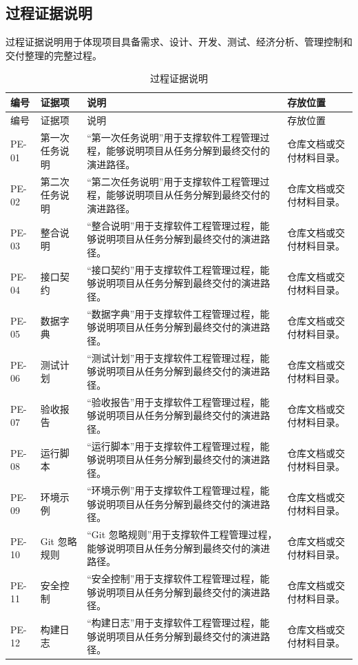 \documentclass[12pt,a4paper]{ctexart}
\begin{document}
\subsection{过程证据说明}
过程证据说明用于体现项目具备需求、设计、开发、测试、经济分析、管理控制和交付整理的完整过程。
\begin{longtable}{L{1.7cm}L{4.0cm}L{6.2cm}L{3.6cm}}
\caption{过程证据说明}\\
\toprule
编号 & 证据项 & 说明 & 存放位置 \\
\midrule
\endfirsthead
\toprule
编号 & 证据项 & 说明 & 存放位置 \\
\midrule
\endhead
PE-01 & 第一次任务说明 & “第一次任务说明”用于支撑软件工程管理过程，能够说明项目从任务分解到最终交付的演进路径。 & 仓库文档或交付材料目录。 \\
PE-02 & 第二次任务说明 & “第二次任务说明”用于支撑软件工程管理过程，能够说明项目从任务分解到最终交付的演进路径。 & 仓库文档或交付材料目录。 \\
PE-03 & 整合说明 & “整合说明”用于支撑软件工程管理过程，能够说明项目从任务分解到最终交付的演进路径。 & 仓库文档或交付材料目录。 \\
PE-04 & 接口契约 & “接口契约”用于支撑软件工程管理过程，能够说明项目从任务分解到最终交付的演进路径。 & 仓库文档或交付材料目录。 \\
PE-05 & 数据字典 & “数据字典”用于支撑软件工程管理过程，能够说明项目从任务分解到最终交付的演进路径。 & 仓库文档或交付材料目录。 \\
PE-06 & 测试计划 & “测试计划”用于支撑软件工程管理过程，能够说明项目从任务分解到最终交付的演进路径。 & 仓库文档或交付材料目录。 \\
PE-07 & 验收报告 & “验收报告”用于支撑软件工程管理过程，能够说明项目从任务分解到最终交付的演进路径。 & 仓库文档或交付材料目录。 \\
PE-08 & 运行脚本 & “运行脚本”用于支撑软件工程管理过程，能够说明项目从任务分解到最终交付的演进路径。 & 仓库文档或交付材料目录。 \\
PE-09 & 环境示例 & “环境示例”用于支撑软件工程管理过程，能够说明项目从任务分解到最终交付的演进路径。 & 仓库文档或交付材料目录。 \\
PE-10 & Git 忽略规则 & “Git 忽略规则”用于支撑软件工程管理过程，能够说明项目从任务分解到最终交付的演进路径。 & 仓库文档或交付材料目录。 \\
PE-11 & 安全控制 & “安全控制”用于支撑软件工程管理过程，能够说明项目从任务分解到最终交付的演进路径。 & 仓库文档或交付材料目录。 \\
PE-12 & 构建日志 & “构建日志”用于支撑软件工程管理过程，能够说明项目从任务分解到最终交付的演进路径。 & 仓库文档或交付材料目录。 \\

\end{longtable}
\end{document}
